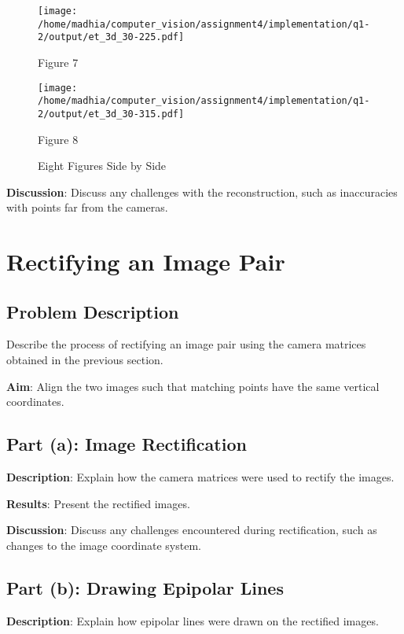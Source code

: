\documentclass{article}
\begin{document}
\begin{figure}[h!]
    \centering    
    \begin{minipage}{0.4\textwidth}
        \centering
        \texttt{[image: /home/madhia/computer\_vision/assignment4/implementation/q1-2/output/et\_3d\_30-225.pdf]}
        \caption{Figure 7}
    \end{minipage}%
    \begin{minipage}{0.4\textwidth}
        \centering
        \texttt{[image: /home/madhia/computer\_vision/assignment4/implementation/q1-2/output/et\_3d\_30-315.pdf]}
        \caption{Figure 8}
    \end{minipage}
    \caption{Eight Figures Side by Side}
\end{figure}


\textbf{Discussion}: Discuss any challenges with the reconstruction, such as inaccuracies with points far from the cameras.

\section{Rectifying an Image Pair}

\subsection{Problem Description}
Describe the process of rectifying an image pair using the camera matrices obtained in the previous section.

\textbf{Aim}: Align the two images such that matching points have the same vertical coordinates.

\subsection{Part (a): Image Rectification}
\textbf{Description}: Explain how the camera matrices were used to rectify the images.

\textbf{Results}: Present the rectified images.


\textbf{Discussion}: Discuss any challenges encountered during rectification, such as changes to the image coordinate system.

\subsection{Part (b): Drawing Epipolar Lines}
\textbf{Description}: Explain how epipolar lines were drawn on the rectified images.
\end{document}
